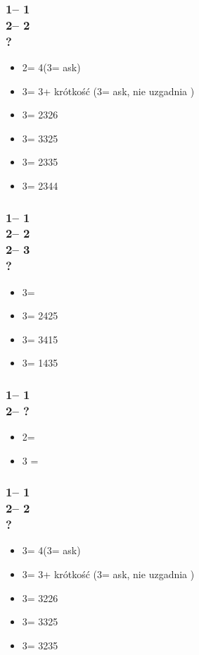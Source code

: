 \documentclass[12pt, a4paper]{report}
\begin{document}
{    \subsubsection*{1\clubs -- 1\hearts\\
                    2\hearts -- 2\spades\\
                    ?}
    \begin{itemize}
        \item 2\nt = 4\hearts (3\clubs = ask)
        \item 3\clubs = 3\hearts + krótkość (3\diams = ask, nie uzgadnia \hearts)
        \item 3\diams = 2326
        \item 3\hearts = 3325
        \item 3\spades = 2335
        \item 3\nt = 2344
    \end{itemize}

    \subsubsection*{1\clubs -- 1\hearts\\
                    2\hearts -- 2\spades\\
                    2\nt -- 3\clubs\\
                    ?}
    \begin{itemize}
        \item 3\diams = \bal
        \item 3\hearts = 2425
        \item 3\spades = 3415
        \item 3\nt = 1435
    \end{itemize}

    \subsubsection*{1\clubs -- 1\spades\\
                    2\spades -- ?}
    \begin{itemize}
        \item 2\nt = \gf
        \item 3 = \inv
    \end{itemize}

    \subsubsection*{1\clubs -- 1\spades\\
                    2\spades -- 2\nt\\
                    ?}
    \begin{itemize}
        \item 3\clubs = 4\spades (3\diams = ask)
        \item 3\diams = 3\spades + krótkość (3\hearts = ask, nie uzgadnia \spades)
        \item 3\hearts = 3226
        \item 3\spades = 3325
        \item 3\nt = 3235
    \end{itemize}

}
\end{document}
